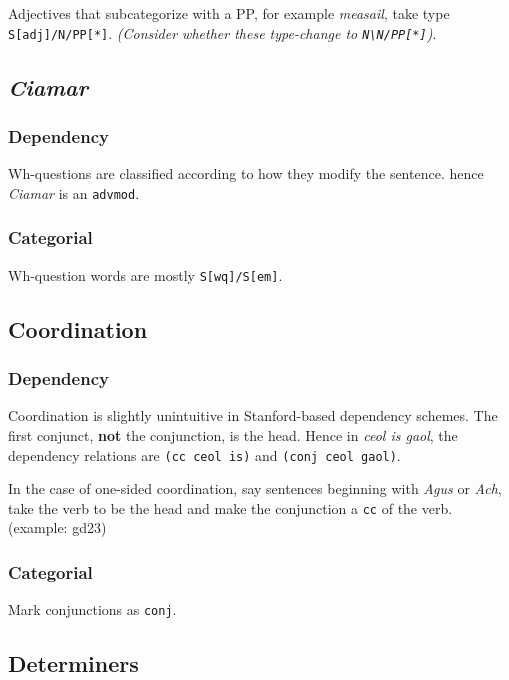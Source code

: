 \documentclass[a4paper]{article}
\begin{document}
 Adjectives that subcategorize with a PP, for example \textit{measail}, take type \texttt{S[adj]/N/PP[*]}. \textit{(Consider whether these type-change to \texttt{N\textbackslash N/PP[*]})}.

\subsection{\textit{Ciamar}}

\subsubsection{Dependency}
 Wh-questions are classified according to how they modify the sentence. hence \textit{Ciamar} is an \texttt{advmod}.

\subsubsection{Categorial}
 Wh-question words are mostly \texttt{S[wq]/S[em]}.

\subsection{Coordination}
\subsubsection{Dependency}

 Coordination is slightly unintuitive in Stanford-based dependency schemes. The first conjunct, \textbf{not} the conjunction, is the head. Hence in \textit{ceol is gaol}, the dependency relations are \texttt{(cc ceol is)} and \texttt{(conj ceol gaol)}.

 In the case of one-sided coordination, say sentences beginning with \textit{Agus} or \textit{Ach}, take the verb to be the head and make the conjunction a \texttt{cc} of the verb. (example: gd23)

\subsubsection{Categorial}

 Mark conjunctions as \texttt{conj}.





\subsection{Determiners}
\end{document}
